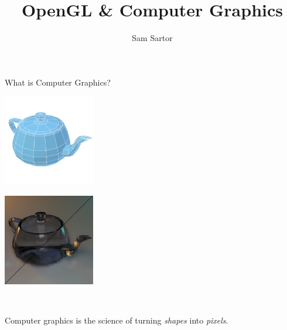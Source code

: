 \documentclass{lug}
\title{OpenGL \& Computer Graphics}
\author{Sam Sartor}
\institute{Mines Linux Users Group}
\begin{document}
\newcommand{\pmidg}[1]{\parbox{\widthof{#1}}{#1}}

\begin{frame}{What is Computer Graphics?}
\begin{center}
    \pmidg{\includegraphics[width=4cm]{graphics/teapot_mesh}} \scalebox{2}{$\rightarrow$} \pmidg{\includegraphics[width=4cm]{graphics/teapot_rt_pix}} \\
    
    \bigskip

    Computer graphics is the science of turning \textit{shapes} into \textit{pixels}.
\end{center}
\end{frame}
\end{document}
